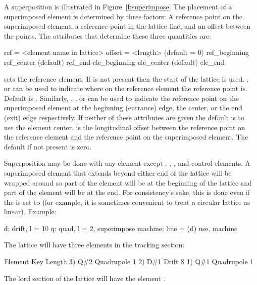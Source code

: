 A superposition is illustrated in Figure~\ref{f:superimpose} The
placement of a superimposed element is determined by three factors: A
reference point on the superimposed element, a reference point in the
lattice line, and an offset between the points. The attributes that
determine these three quantities are: 
\begin{example}
  ref = <element name in lattice>
  offset = <length>      (default = 0)
  ref_beginning
  ref_center             (default)
  ref_end
  ele_beginning
  ele_center             (default)
  ele_end
\end{example}
 sets the reference element. If  is not present then
the start of the lattice is used. , 
or  can be used to indicate where on the reference element
the reference point is. Default is . Similarly,
, , or  can be used to
indicate the reference point on the superimposed element at the
beginning (entrance) edge, the center, or the end (exit) edge
respectively. If neither of these attributes are given the default is
to use the element center.  is the longitudinal offset
between the reference point on the reference element and the reference
point on the superimposed element. The default if not present is zero.

Superposition may be done with any element except ,
, , and  control elements. A
superimposed element that extends beyond either end of the lattice
will be wrapped around so part of the element will be at the beginning
of the lattice and part of the element will be at the end. For
consistency's sake, this is done even if the  is set
to  (for example, it is sometimes convenient to
treat a circular lattice as linear). Example:
\begin{example}
  d: drift, l = 10
  q: quad, l = 2, superimpose
  machine: line = (d)
  use, machine
\end{example}
The lattice will have three elements in the tracking section:
\begin{example}
        Element   Key           Length
  3)    Q{\#}2       Quadrupole    1
  2)    D{\#}1       Drift         8
  1)    Q{\#}1       Quadrupole    1
\end{example}
The lord section of the lattice will have the element . 

